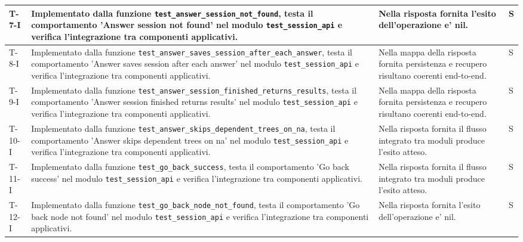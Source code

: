 \documentclass[a4paper,12pt]{article}
\begin{document}
{{\begin{longtable}{|>{\RaggedRight\arraybackslash}p{1.55cm}|>{\RaggedRight\arraybackslash}p{8.0cm}|>{\RaggedRight\arraybackslash}p{4.6cm}|>{\RaggedRight\arraybackslash}p{1.2cm}|}
        \hline
        T-7-I & Implementato dalla funzione \texttt{test\_\allowbreak answer\_\allowbreak session\_\allowbreak not\_\allowbreak found}, testa il comportamento 'Answer session not found' nel modulo \texttt{test\_\allowbreak session\_\allowbreak api} e verifica l'integrazione tra componenti applicativi. & Nella risposta fornita l'esito dell'operazione e' nil. & S \\
        \hline
        T-8-I & Implementato dalla funzione \texttt{test\_\allowbreak answer\_\allowbreak saves\_\allowbreak session\_\allowbreak after\_\allowbreak each\_\allowbreak answer}, testa il comportamento 'Answer saves session after each answer' nel modulo \texttt{test\_\allowbreak session\_\allowbreak api} e verifica l'integrazione tra componenti applicativi. & Nella mappa della risposta fornita persistenza e recupero risultano coerenti end-to-end. & S \\
        \hline
        T-9-I & Implementato dalla funzione \texttt{test\_\allowbreak answer\_\allowbreak session\_\allowbreak finished\_\allowbreak returns\_\allowbreak results}, testa il comportamento 'Answer session finished returns results' nel modulo \texttt{test\_\allowbreak session\_\allowbreak api} e verifica l'integrazione tra componenti applicativi. & Nella mappa della risposta fornita persistenza e recupero risultano coerenti end-to-end. & S \\
        \hline
        T-10-I & Implementato dalla funzione \texttt{test\_\allowbreak answer\_\allowbreak skips\_\allowbreak dependent\_\allowbreak trees\_\allowbreak on\_\allowbreak na}, testa il comportamento 'Answer skips dependent trees on na' nel modulo \texttt{test\_\allowbreak session\_\allowbreak api} e verifica l'integrazione tra componenti applicativi. & Nella risposta fornita il flusso integrato tra moduli produce l'esito atteso. & S \\
        \hline
        T-11-I & Implementato dalla funzione \texttt{test\_\allowbreak go\_\allowbreak back\_\allowbreak success}, testa il comportamento 'Go back success' nel modulo \texttt{test\_\allowbreak session\_\allowbreak api} e verifica l'integrazione tra componenti applicativi. & Nella risposta fornita il flusso integrato tra moduli produce l'esito atteso. & S \\
        \hline
        T-12-I & Implementato dalla funzione \texttt{test\_\allowbreak go\_\allowbreak back\_\allowbreak node\_\allowbreak not\_\allowbreak found}, testa il comportamento 'Go back node not found' nel modulo \texttt{test\_\allowbreak session\_\allowbreak api} e verifica l'integrazione tra componenti applicativi. & Nella risposta fornita l'esito dell'operazione e' nil. & S \\

\end{longtable}}}
\end{document}
